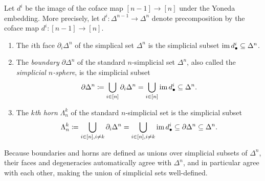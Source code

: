 \begin{definition}\label{3.4.8}
    Let $d^i$ be the image of the coface map $[n-1]\to[n]$ under the Yoneda embedding. More precisely, let $d^i : \Delta^{n-1}\to\Delta^n$ denote precomposition by the coface map $d^i:[n-1]\to[n]$.
    \begin{enumerate}
        \item The $i$th face $\partial_i\Delta^n$ of the simplical set $\Delta^n$ is the simplicial subset $\operatorname{im} d^i_\bullet \subseteq \Delta ^n$.
        \item The \emph{boundary} $\partial\Delta^n$ of the standard $n$-simplicial set $\Delta^n$, also called the \emph{simplicial $n$-sphere}, is the simplicial subset
        \[
        \partial\Delta^n \coloneqq\bigcup_{i\in[n]} \partial_i\Delta^n=\bigcup_{i\in[n]}\operatorname{im} d^i_\bullet \subseteq\Delta^n.
        \]
        \item The \emph{$k$th horn} $\Lambda_n^k$ of the standard $n$-simplicial set is the simplicial subset
        \[
        \Lambda_n^k\coloneqq\bigcup_{i\in[n],i\neq k}\partial_i\Delta^n=\bigcup_{i\in[n],i\neq k}\operatorname{im} d^i_\bullet \subseteq\partial\Delta^n\subseteq\Delta^n.
        \]
    \end{enumerate}
\end{definition}

\begin{remark}\label{3.4.9}
    Because boundaries and horns are defined as unions over simplicial subsets of $\Delta^n$, their faces and degeneracies automatically agree with $\Delta^n$, and in particular agree with each other, making the union of simplicial sets well-defined.
\end{remark}


